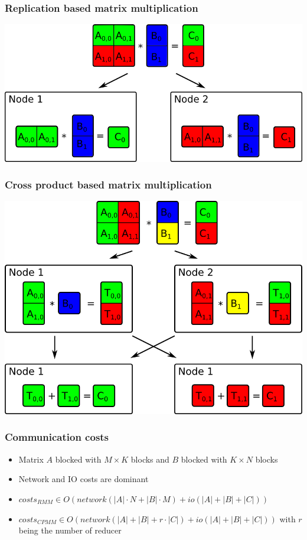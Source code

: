 \section*{}

\begin{frame}
	\frametitle{Replication based matrix multiplication}
	\begin{center}
	\includegraphics[width=\textwidth]{images/rmm.png}
	\end{center}
\end{frame}	

\begin{frame}
	\frametitle{Cross product based matrix multiplication}
	\begin{center}
	\includegraphics[height=0.8\textheight]{images/cpmm.png}
	\end{center}
\end{frame}

\begin{frame}
	\frametitle{Communication costs}
	\begin{itemize}
		\item Matrix $A$ blocked with $M \times K$ blocks and $B$ blocked with $K \times N$ blocks
		\item Network and IO costs are dominant
		\item $costs_{RMM} \in O\left(network(|A|\cdot N + |B|\cdot M) + io(|A|+|B|+|C|)\right)$
		\item $costs_{CPMM} \in O\left(network(|A|+|B|+r\cdot|C|) + io(|A|+|B|+|C|) \right)$ with $r$ being the number of reducer
	\end{itemize}
\end{frame}

